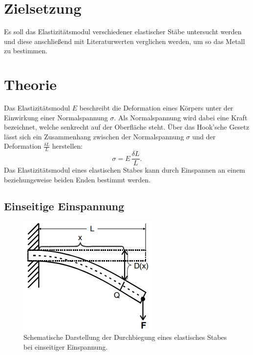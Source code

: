 \section{Zielsetzung}
    Es soll das Elastizitätsmodul verschiedener elastischer Stäbe untersucht werden und diese anschließend 
    mit Literaturwerten verglichen werden, um so das Metall zu bestimmen.
\section{Theorie}
\label{sec:theorie}
    Das Elastizitätsmodul $E$ beschreibt die Deformation eines Körpers unter der Einwirkung einer Normalspannung $\sigma$. Als Normalspannung wird dabei eine Kraft
    bezeichnet, welche senkrecht auf der Oberfläche steht. Über das Hook'sche Gesetz lässt sich ein Zusammenhang zwischen der Normalspannung $\sigma$ und
    der Deformation $\frac{\delta L}{L}$ herstellen:
    \begin{equation}
    \label{eqn:hook}
        \sigma = E \, \frac{\delta L}{L}.
    \end{equation}
    Das Elastizitätsmodul eines elastischen Stabes kann durch Einspannen an einem beziehungsweise beiden Enden bestimmt werden.

    \subsection{Einseitige Einspannung}

    \begin{figure}
        \centering
        \includegraphics{content/einseitig.png}
        \caption{Schematische Darstellung der Durchbiegung eines elastisches Stabes bei einseitiger Einspannung. \cite{V103-s107}}
        \label{fig:einseitig}
    \end{figure}
    
